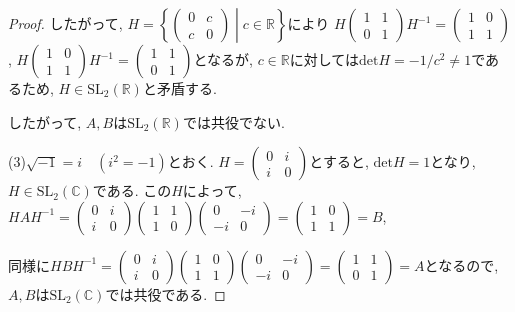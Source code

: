 \begin{proof}
したがって, 
$H=\left\{ \begin{pmatrix}0&c\\c&0\end{pmatrix} \middle\vert c \in \mathbb{R} \right\}$により
$H\begin{pmatrix}1&1\\0&1\end{pmatrix}H^{-1}=\begin{pmatrix}1&0\\1&1\end{pmatrix}$,
$H\begin{pmatrix}1&0\\1&1\end{pmatrix}H^{-1}=\begin{pmatrix}1&1\\0&1\end{pmatrix}$となるが,
$c \in \mathbb{R}$に対しては$\mathrm{det}H=-1/c^2\neq 1$であるため,
$H \in \mathrm{SL}_2(\mathbb{R})$と矛盾する.

したがって, $A,B$は$\mathrm{SL}_2(\mathbb{R})$では共役でない.

(3)$\sqrt{-1}=i\quad (i^2=-1)$とおく. 
$H=\begin{pmatrix} 0&i\\i&0 \end{pmatrix}$とすると, $\mathrm{det}H=1$となり,
$ H \in \mathrm{SL}_2(\mathbb{C})$である.
この$H$によって, $HAH^{-1}=\begin{pmatrix}0&i \\i&0 \end{pmatrix} \begin{pmatrix}1&1\\1&0\end{pmatrix} \begin{pmatrix}0&-i\\-i&0\end{pmatrix} 
=\begin{pmatrix}1&0\\1&1\end{pmatrix}=B$,

同様に$HBH^{-1}=\begin{pmatrix}0&i \\i&0 \end{pmatrix} 
\begin{pmatrix}1&0\\1&1\end{pmatrix} \begin{pmatrix}0&-i\\-i&0\end{pmatrix} 
=\begin{pmatrix}1&1\\0&1\end{pmatrix}=A$となるので,
$A,B$は$\mathrm{SL}_2(\mathbb{C})$では共役である.
\end{proof}\leavevmode

